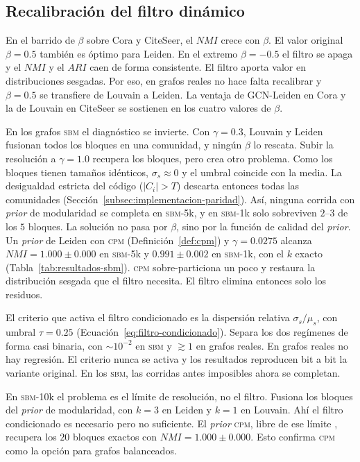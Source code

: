 \documentclass[twoside,twocolumn,10pt]{article}
\begin{document}
\subsection{Recalibración del filtro dinámico}
\label{sec:estudio-recalibracion}

En el barrido de $\beta$ sobre Cora y CiteSeer, el $NMI$ crece con $\beta$. El valor original $\beta = 0.5$ también es óptimo para Leiden. En el extremo $\beta = -0.5$ el filtro se apaga y el $NMI$ y el $ARI$ caen de forma consistente. El filtro aporta valor en distribuciones sesgadas. Por eso, en grafos reales no hace falta recalibrar y $\beta = 0.5$ se transfiere de Louvain a Leiden. La ventaja de GCN-Leiden en Cora y la de Louvain en CiteSeer se sostienen en los cuatro valores de $\beta$.

En los grafos \textsc{sbm} el diagnóstico se invierte. Con $\gamma = 0.3$, Louvain y Leiden fusionan todos los bloques en una comunidad, y ningún $\beta$ lo rescata. Subir la resolución a $\gamma = 1.0$ recupera los bloques, pero crea otro problema. Como los bloques tienen tamaños idénticos, $\sigma_s \approx 0$ y el umbral coincide con la media. La desigualdad estricta del código ($|C_i| > T$) descarta entonces todas las comunidades (Sección~\ref{subsec:implementacion-paridad}). Así, ninguna corrida con \textit{prior} de modularidad se completa en \textsc{sbm}-5k, y en \textsc{sbm}-1k solo sobreviven $2$--$3$ de los $5$ bloques. La solución no pasa por $\beta$, sino por la función de calidad del \textit{prior}. Un \textit{prior} de Leiden con \textsc{cpm} (Definición~\ref{def:cpm}) \cite{Traag2019} y $\gamma = 0.0275$ alcanza $NMI = 1.000 \pm 0.000$ en \textsc{sbm}-5k y $0.991 \pm 0.002$ en \textsc{sbm}-1k, con el $k$ exacto (Tabla~\ref{tab:resultados-sbm}). \textsc{cpm} sobre-particiona un poco y restaura la distribución sesgada que el filtro necesita. El filtro elimina entonces solo los residuos.

El criterio que activa el filtro condicionado es la dispersión relativa $\sigma_s/\mu_s$, con umbral $\tau = 0.25$ (Ecuación~\ref{eq:filtro-condicionado}). Separa los dos regímenes de forma casi binaria, con $\sim 10^{-2}$ en \textsc{sbm} y $\gtrsim 1$ en grafos reales. En grafos reales no hay regresión. El criterio nunca se activa y los resultados reproducen bit a bit la variante original. En los \textsc{sbm}, las corridas antes imposibles ahora se completan.

En \textsc{sbm}-10k el problema es el límite de resolución, no el filtro. Fusiona los bloques del \textit{prior} de modularidad, con $k=3$ en Leiden y $k=1$ en Louvain. Ahí el filtro condicionado es necesario pero no suficiente. El \textit{prior} \textsc{cpm}, libre de ese límite \cite{Traag2019}, recupera los $20$ bloques exactos con $NMI = 1.000 \pm 0.000$. Esto confirma \textsc{cpm} como la opción para grafos balanceados.
\end{document}
